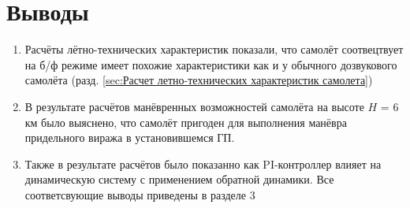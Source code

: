 \newpage
\section{Выводы}
\begin{enumerate}
    \item Расчёты лётно-технических характеристик показали, что самолёт соотвецтвует на б/ф режиме имеет похожие характеристики 
    как и у обычного дозвукового самолёта (разд. \ref{sec:Расчет летно-технических характеристик самолета}) 
    \item В результате расчётов манёвренных возможностей самолёта на высоте $H$ = 6 км было выяснено, что самолёт пригоден для выполнения 
    манёвра придельного виража в установившемся ГП.
    \item  Также в результате расчётов было показанно как PI-контроллер влияет на динамическую систему с применением обратной динамики. Все соответсвующие выводы приведены в разделе 
    3
\end{enumerate}